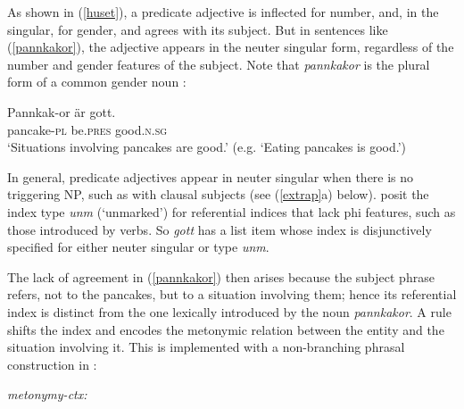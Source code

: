 \documentclass[output=paper
	        ,collection
	        ,collectionchapter
 	        ,biblatex
                ,babelshorthands
                ,newtxmath
                ,draftmode
                ,colorlinks, citecolor=brown
]{langscibook}
\begin{document}
\noindent
As shown in (\ref{huset}), a predicate adjective is inflected for number, and, in the singular, for gender, and agrees with its subject. But in sentences like (\ref{pannkakor}), the adjective appears in the neuter singular form, regardless of the number and gender features of the subject.  Note that \textit{pannkakor} is the plural form of a common gender noun \citep{Faarlund:1977, Enger:2004,Josefsson:2009}:

\begin{exe} 
\ex \label{pannkakor}
\gll   Pannkak-or 	är	gott. \\
	pancake-\textsc{pl}	be.\textsc{pres}	good.\textsc{n.sg} \\
\glt	`Situations involving pancakes are good.’ (e.g. `Eating pancakes is good.’)
\end{exe}

\noindent
In general,  predicate adjectives appear in neuter singular when there is no triggering NP, such as with clausal subjects (see (\ref{extrap}a) below).  \citet{Wechsler+Zlatic:2003} posit the index type \textit{unm} (`unmarked') for  referential indices that lack phi features, such as those introduced by verbs.   So \textit{gott} has a \subj list item whose index  is disjunctively specified for either neuter singular or type \textit{unm}.  

The lack of agreement in (\ref{pannkakor}) then arises because the subject phrase refers, not to the pancakes, but to a situation involving them; hence its referential index is distinct from the one lexically introduced by the noun \textit{pannkakor}.  A rule shifts the index and encodes the metonymic relation between the entity and the situation involving it.  This  is implemented with a non-branching phrasal construction in \citet[82, example\,(20)]{Wechsler:2013}:

\begin{exe} 
\ex	
\label{metonymy}
\textit{metonymy-ctx:}\\
\end{exe}
\end{document}
